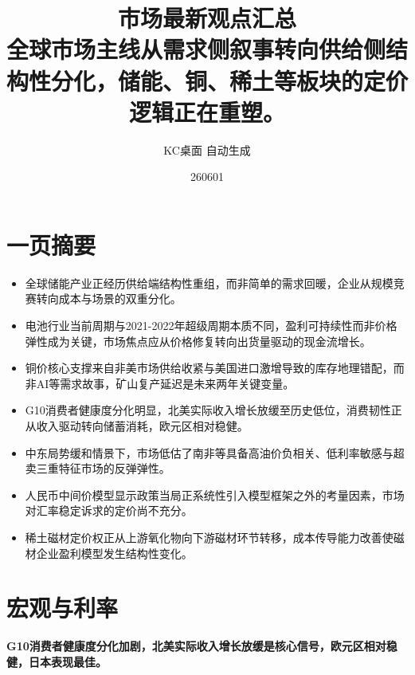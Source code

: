 \documentclass[11pt]{ctexart}
\title{\textbf{市场最新观点汇总}\\[0.4em]{\large 全球市场主线从需求侧叙事转向供给侧结构性分化，储能、铜、稀土等板块的定价逻辑正在重塑。}}
\author{KC桌面 自动生成}
\date{260601}
\begin{document}
\maketitle
\section*{一页摘要}
\begin{itemize}
  \item 全球储能产业正经历供给端结构性重组，而非简单的需求回暖，企业从规模竞赛转向成本与场景的双重分化。
  \item 电池行业当前周期与2021-2022年超级周期本质不同，盈利可持续性而非价格弹性成为关键，市场焦点应从价格修复转向出货量驱动的现金流增长。
  \item 铜价核心支撑来自非美市场供给收紧与美国进口激增导致的库存地理错配，而非AI等需求故事，矿山复产延迟是未来两年关键变量。
  \item G10消费者健康度分化明显，北美实际收入增长放缓至历史低位，消费韧性正从收入驱动转向储蓄消耗，欧元区相对稳健。
  \item 中东局势缓和情景下，市场低估了南非等具备高油价负相关、低利率敏感与超卖三重特征市场的反弹弹性。
  \item 人民币中间价模型显示政策当局正系统性引入模型框架之外的考量因素，市场对汇率稳定诉求的定价尚不充分。
  \item 稀土磁材定价权正从上游氧化物向下游磁材环节转移，成本传导能力改善使磁材企业盈利模型发生结构性变化。
\end{itemize}
\section{宏观与利率}
\textbf{G10消费者健康度分化加剧，北美实际收入增长放缓是核心信号，欧元区相对稳健，日本表现最佳。}
\end{document}
